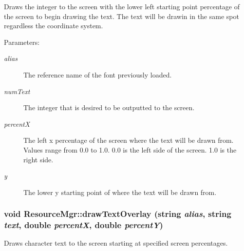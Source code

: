 Draws the integer to the screen with the lower left starting point percentage of the screen to begin drawing the text. The text will be drawin in the same spot regardless the coordinate system. \begin{Desc}
\item[Parameters:]
\begin{description}
\item[{\em alias}]The reference name of the font previously loaded. \item[{\em numText}]The integer that is desired to be outputted to the screen. \item[{\em percentX}]The left x percentage of the screen where the text will be drawn from. Values range from 0.0 to 1.0. 0.0 is the left side of the screen. 1.0 is the right side. \item[{\em y}]The lower y starting point of where the text will be drawn from. \end{description}
\end{Desc}
\hypertarget{class_resource_mgr_cc2c71fee0d3218a25c1b5fceb6dca46}{
\subsubsection[{drawTextOverlay}]{\setlength{\rightskip}{0pt plus 5cm}void ResourceMgr::drawTextOverlay (string {\em alias}, \/  string {\em text}, \/  double {\em percentX}, \/  double {\em percentY})}}
\label{class_resource_mgr_cc2c71fee0d3218a25c1b5fceb6dca46}


Draws character text to the screen starting at specified screen percentages. 


